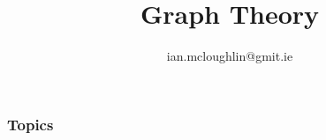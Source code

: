 \documentclass[dvipsnames]{beamer}
\begin{document}
  \title{Graph Theory}
  \subtitle{}
  \author{ian.mcloughlin@gmit.ie}
  \date{}

  \begin{frame}
    \titlepage
  \end{frame}

  \begin{frame}
    \frametitle{Topics}
    \tableofcontents
  \end{frame}

  
  
  
  
\end{document}
